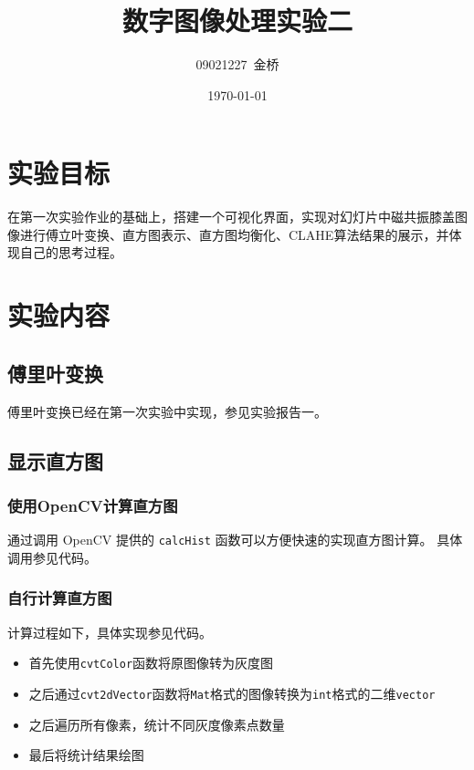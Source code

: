 \documentclass{article}
\title{数字图像处理实验二}
\author{09021227~金桥}
\date{\today}
\begin{document}
\maketitle

\section{实验目标}

在第一次实验作业的基础上，搭建一个可视化界面，实现对幻灯片中磁共振膝盖图像进行傅立叶变换、直方图表示、直方图均衡化、CLAHE算法结果的展示，并体现自己的思考过程。

\section{实验内容}

\subsection{傅里叶变换}

傅里叶变换已经在第一次实验中实现，参见实验报告一。

\subsection{显示直方图}

\subsubsection{使用OpenCV计算直方图}

通过调用 OpenCV 提供的 \texttt{calcHist} 函数可以方便快速的实现直方图计算。
具体调用参见代码。

\subsubsection{自行计算直方图}

计算过程如下，具体实现参见代码。

\begin{itemize}
    \item 首先使用\texttt{cvtColor}函数将原图像转为灰度图
    \item 之后通过\texttt{cvt2dVector}函数将\texttt{Mat}格式的图像转换为\texttt{int}格式的二维\texttt{vector}
    \item 之后遍历所有像素，统计不同灰度像素点数量
    \item 最后将统计结果绘图
\end{itemize}
\end{document}
